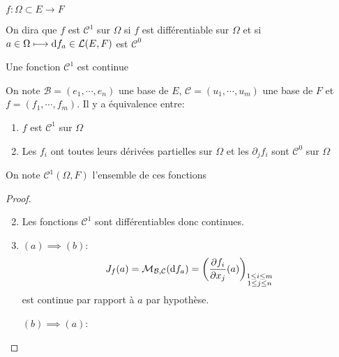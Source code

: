\begin{thmdef}
    \Hyp $f:\Omega\subset E\longrightarrow F$
    \begin{concenum}
    \item On dira que $f$ est $\mathcal C^1$ sur $\Omega$ si $f$ est différentiable sur $\Omega$ et si $a\in\Omega \longmapsto \mathrm{d} f_a\in\mathcal L(E, F)$ est $\mathcal C^0$
        \item Une fonction $\mathcal C^1$ est continue
        \item On note $\mathcal B=(e_1, \cdots, e_n)$ une base de $E$, $\mathcal C=(u_1, \cdots, u_m)$ une base de $F$ et $f=(f_1, \cdots, f_m)$. Il y a équivalence entre: \begin{enumerate}
            \item $f$ est $\mathcal C^1$ sur $\Omega$
            \item Les $f_i$ ont toutes leurs dérivées partielles sur $\Omega$ et les $\partial_jf_i$ sont $\mathcal C^0$ sur $\Omega$
        \end{enumerate}
    \item On note $\mathcal C^1(\Omega, F)$ l'ensemble de ces fonctions
    \end{concenum}
\end{thmdef}

\begin{proof}~
    \begin{enumerate}
        \setcounter{enumi}{1}
        \item Les fonctions $\mathcal C^1$ sont différentiables donc continues.
        \item $(a) \implies (b)$: \[
                J_f(a)=\mathcal M_{\mathcal B, \mathcal C}(\mathrm{d} f_a)= \left( \frac{\partial f_i}{\partial x_j} (a) \right)_{\substack{1\leq i\leq m\\1\leq j\leq n}}
            \]
            est continue par rapport à $a$ par hypothèse.

            $(b) \implies (a)$: 
    \end{enumerate}
\end{proof}

